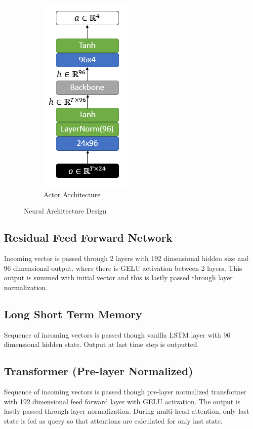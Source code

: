 \begin{figure}
\begin{subfigure}{.5\textwidth}
		\includegraphics[width=0.55\linewidth]{figures/nets/actor.png}
		\caption{Actor Architecture}
		\label{fig:actor_net}
	\end{subfigure}
	\caption{Neural Architecture Design}
	\label{fig:nets}
\end{figure}

\subsection{Residual Feed Forward Network}

Incoming vector is passed through 2 layers with 192 dimensional hidden size and 96 dimensional output, where there is GELU activation between 2 layers. 
This output is summed with initial vector and this is lastly passed through layer normalization. 

\subsection{Long Short Term Memory}

Sequence of incoming vectors is passed though vanilla LSTM layer with 96 dimensional hidden state. 
Output at last time step is outputted. 

\subsection{Transformer (Pre-layer Normalized)}

Sequence of incoming vectors is passed though pre-layer normalized transformer with 192 dimensional feed forward layer with GELU activation. 
The output is lastly passed through layer normalization. 
During multi-head attention, only last state is fed as query so that attentions are calculated for only last state. 

